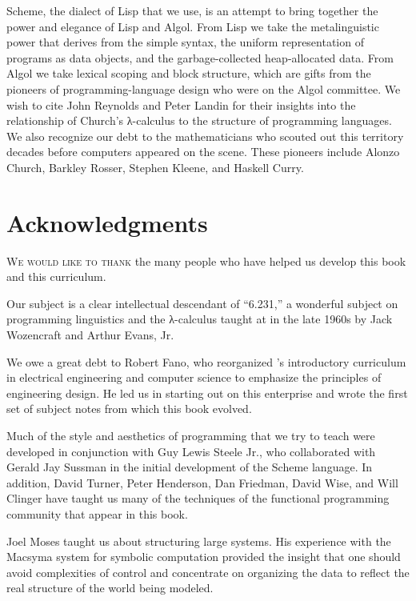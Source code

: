 Scheme, the dialect of Lisp that we use, is an attempt to bring together the
power and elegance of Lisp and Algol.  From Lisp we take the metalinguistic
power that derives from the simple syntax, the uniform representation of
programs as data objects, and the garbage-collected heap-allocated data.  From
Algol we take lexical scoping and block structure, which are gifts from the
pioneers of programming-language design who were on the Algol committee.  We
wish to cite John Reynolds and Peter Landin for their insights into the
relationship of Church's λ-calculus to the structure of programming
languages.  We also recognize our debt to the mathematicians who scouted out
this territory decades before computers appeared on the scene.  These pioneers
include Alonzo Church, Barkley Rosser, Stephen Kleene, and Haskell Curry.

\chapter*{Acknowledgments}
\label{Acknowledgments}

\lettrine[findent=1pt]{W}{e would like to thank} the many people who have helped us develop this book and
this curriculum.

Our subject is a clear intellectual descendant of ``6.231,'' a wonderful
subject on programming linguistics and the λ-calculus taught at
 in the late 1960s by Jack Wozencraft and Arthur Evans, Jr.

We owe a great debt to Robert Fano, who reorganized 's
introductory curriculum in electrical engineering and computer science to
emphasize the principles of engineering design.  He led us in starting out on
this enterprise and wrote the first set of subject notes from which this book
evolved.

Much of the style and aesthetics of programming that we try to teach were
developed in conjunction with Guy Lewis Steele Jr., who collaborated with
Gerald Jay Sussman in the initial development of the Scheme language.  In
addition, David Turner, Peter Henderson, Dan Friedman, David Wise, and Will
Clinger have taught us many of the techniques of the functional programming
community that appear in this book.

Joel Moses taught us about structuring large systems.  His experience with the
Macsyma system for symbolic computation provided the insight that one should
avoid complexities of control and concentrate on organizing the data to reflect
the real structure of the world being modeled.

